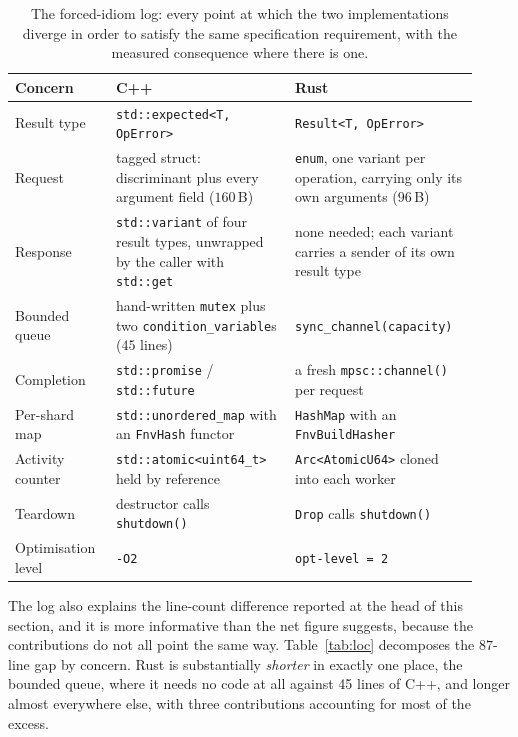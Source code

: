 \documentclass[english,twoside,openright,a4paper,censored,csm,software-track-2020]{HYthesisML}
\begin{document}
\begin{table}
\centering
\small
\caption[The forced-idiom log]{The forced-idiom log: every point at which the two implementations diverge in order
to satisfy the same specification requirement, with the measured consequence where there is
one.\label{tab:idioms}}
\begin{tabular}{@{}R{0.20\linewidth} R{0.36\linewidth} R{0.36\linewidth}@{}}
\hline\hline
Concern & C++ & Rust \\
\hline
Result type & \texttt{std::expected<T, OpError>} & \texttt{Result<T, OpError>} \\
Request & tagged struct: discriminant plus every argument field ($160$\,B) & \texttt{enum}, one variant per operation, carrying only its own arguments ($96$\,B) \\
Response & \texttt{std::variant} of four result types, unwrapped by the caller with \texttt{std::get} & none needed; each variant carries a sender of its own result type \\
Bounded queue & hand-written \texttt{mutex} plus two \texttt{condition\_variable}s ($45$ lines) & \texttt{sync\_channel(capacity)} \\
Completion & \texttt{std::promise} / \texttt{std::future} & a fresh \texttt{mpsc::channel()} per request \\
Per-shard map & \texttt{std::unordered\_map} with an \texttt{FnvHash} functor & \texttt{HashMap} with an \texttt{FnvBuildHasher} \\
Activity counter & \texttt{std::atomic<uint64\_t>} held by reference & \texttt{Arc<AtomicU64>} cloned into each worker \\
Teardown & destructor calls \texttt{shutdown()} & \texttt{Drop} calls \texttt{shutdown()} \\
Optimisation level & \texttt{-O2} & \texttt{opt-level = 2} \\
\hline
\end{tabular}
\end{table}

The log also explains the line-count difference reported at the head of this section, and it
is more informative than the net figure suggests, because the contributions do not all point
the same way. Table~\ref{tab:loc} decomposes the $87$-line gap by concern. Rust is
substantially \emph{shorter} in exactly one place, the bounded queue, where it needs no code
at all against 45 lines of C++, and longer almost everywhere else, with three contributions
accounting for most of the excess.
\end{document}
